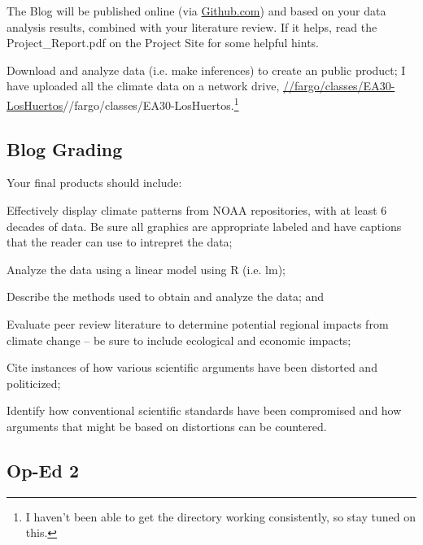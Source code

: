 \documentclass{article}\usepackage[]{graphicx}\usepackage[]{color}
\newenvironment{itemize*}%
  {\begin{itemize}%
    \setlength{\itemsep}{0pt}%
    \setlength{\parskip}{0pt}}%
  {\end{itemize}}
\newenvironment{enumerate*}%
  {\begin{enumerate}%
    \setlength{\itemsep}{0pt}%
    \setlength{\parskip}{0pt}}%
  {\end{enumerate}}
\begin{document}
The Blog will be published online (via \url{Github.com}) and based on your data analysis results, combined with your literature review. If it helps, read the Project\_Report.pdf on the Project Site for some helpful hints.

\begin{enumerate*}

  \item Download and analyze data (i.e. make inferences) to create an public product; I have uploaded all the climate data on a network drive, \url{//fargo/classes/EA30-LosHuertos}{//fargo/classes/EA30-LosHuertos}.\footnote{I haven't been able to get the directory working consistently, so stay tuned on this.}
  
\end{enumerate*}

\subsection{Blog Grading}

Your final products should include:

\begin{itemize*}
  \item Effectively display climate patterns from NOAA repositories, with at least 6 decades of data. Be sure all graphics are appropriate labeled and have captions that the reader can use to intrepret the data;
  \item Analyze the data using a linear model using R (i.e. lm);
  \item Describe the methods used to obtain and analyze the data; and
  \item Evaluate peer review literature to determine potential regional impacts from climate change -- be sure to include ecological and economic impacts; 
  \item Cite instances of how various scientific arguments have been distorted and politicized;
  \item Identify how conventional scientific standards have been compromised and how arguments that might be based on distortions can be countered.
\end{itemize*}

\subsection{Op-Ed 2}


\end{document}

